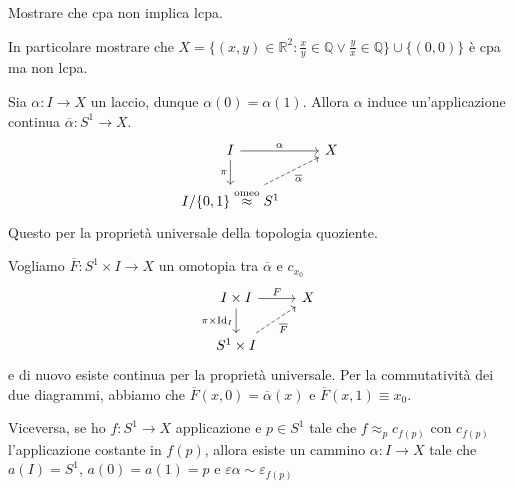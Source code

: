 \begin{eser}
    Mostrare che cpa non implica lcpa.

    In particolare mostrare che \(X = \{{(x,y)} \in \mathbb{R}^2 : \frac{x}{y} \in
    \mathbb{Q} \lor \frac{y}{x} \in \mathbb{Q}\} \cup \{{(0,0)}\} \) è cpa ma
    non lcpa.
\end{eser}

\begin{proposition}
    Sia \(\alpha : I \to X\) un laccio, dunque \(\alpha{(0)} = \alpha{(1)}\).
    Allora \(\alpha\) induce un'applicazione continua \(\overline{\alpha} :
    S^{1} \to X\).
\[\begin{tikzcd}
	I & X \\
	{I/\{0,1\} \overset{\text{omeo}}{\approx} S^1}
	\arrow["\alpha", from=1-1, to=1-2]
	\arrow["\pi"', from=1-1, to=2-1]
	\arrow["{\overline{\alpha}}"', dashed, from=2-1, to=1-2]
\end{tikzcd}\]
Questo per la proprietà universale della topologia quoziente.

Vogliamo \(\overline{F} : S^{1}\times  I \to X\) un omotopia tra
\(\overline{\alpha}\) e \(c_{x_{0}} \) 
\[\begin{tikzcd}
	I \times I & X \\
	{S^1 \times I}
	\arrow["F", from=1-1, to=1-2]
	\arrow["\pi \times \mathrm{Id}_I"', from=1-1, to=2-1]
	\arrow["{\overline{F}}"', dashed, from=2-1, to=1-2]
\end{tikzcd}\]
e di nuovo esiste continua per la proprietà universale.
Per la commutatività dei due diagrammi, abbiamo che \(\overline{F}{(x, 0)} =
\overline{\alpha}{(x)}\) e \(\overline{F}{(x, 1)} \equiv x_{0}\).
\end{proposition}

\begin{proposition}
    Viceversa, 
    se ho \(f: S^{1} \to X\) applicazione e \(p \in S^{1}\) tale che \(f
    \approx_p c_{f{(p)}} \) con \(c_{f{(p)}} \) l'applicazione costante in
    \(f{(p)}\), allora esiste un cammino \(\alpha : I \to X\) tale che \(a{(I)}
    = S^{1}\), \(a{(0)}= a{(1)} = p\) e \(\varepsilon \alpha \sim
    \varepsilon_{f{(p)}} \) 
\end{proposition}

